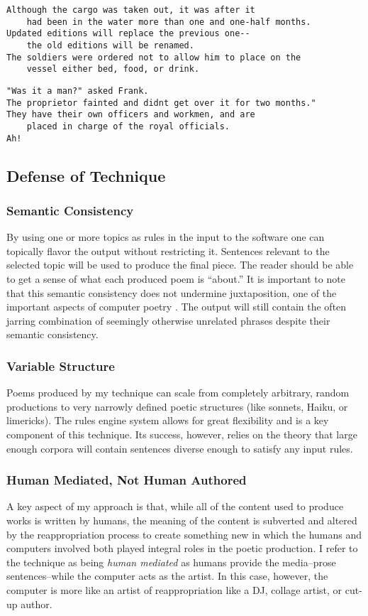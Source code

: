 \documentclass[10pt]{article}
\begin{document}
\begin{verbatim}
Although the cargo was taken out, it was after it 
    had been in the water more than one and one-half months.
Updated editions will replace the previous one--
    the old editions will be renamed.
The soldiers were ordered not to allow him to place on the 
    vessel either bed, food, or drink.
\end{verbatim}

\begin{verbatim}
"Was it a man?" asked Frank.
The proprietor fainted and didnt get over it for two months."
They have their own officers and workmen, and are 
    placed in charge of the royal officials.
Ah!
\end{verbatim}

\subsection{Defense of Technique}

\subsubsection{Semantic Consistency}
By using one or more topics as rules in the input to the software one can
topically flavor the output without restricting it. Sentences relevant to the
selected topic will be used to produce the final piece. The reader should be
able to get a sense of what each produced poem is ``about.'' It is important to
note that this semantic consistency does not undermine juxtaposition, one of
the important aspects of computer poetry \cite{Hart96}. The output will still
contain the often jarring combination of seemingly otherwise unrelated phrases
despite their semantic consistency.

\subsubsection{Variable Structure}
Poems produced by my technique can scale from completely arbitrary, random
productions to very narrowly defined poetic structures (like sonnets, Haiku, or
limericks). The rules engine system allows for great flexibility and is a key
component of this technique. Its success, however, relies on the theory that
large enough corpora will contain sentences diverse enough to satisfy any input
rules.

\subsubsection{Human Mediated, Not Human Authored}
A key aspect of my approach is that, while all of the content used to produce
works is written by humans, the meaning of the content is subverted and altered
by the reappropriation process to create something new in which the humans and
computers involved both played integral roles in the poetic production. I refer
to the technique as being \emph{human mediated} as humans provide the
media--prose sentences--while the computer acts as the artist. In this case,
however, the computer is more like an artist of reappropriation like a DJ,
collage artist, or cut-up author.
\end{document}
